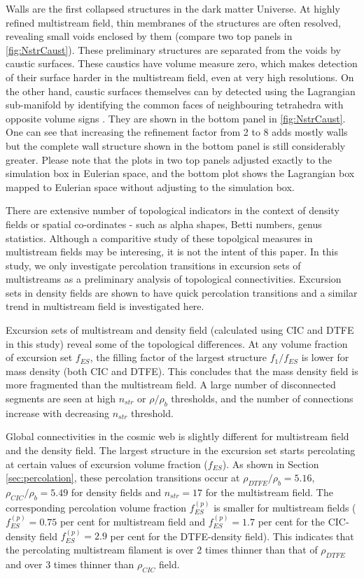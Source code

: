 \documentclass[fleqn,usenatbib,useAMS]{mnras}
\begin{document}
Walls are the first collapsed structures in the dark matter Universe. At highly refined multistream field, thin membranes of the structures are often resolved, revealing small voids enclosed by them (compare two top panels in \autoref{fig:NstrCaust}). These preliminary structures are separated from the voids by caustic surfaces. These caustics have volume measure zero, which makes detection of their surface harder in the multistream field, even at very high resolutions. On the other hand, caustic surfaces themselves can by detected using the Lagrangian sub-manifold by identifying the common faces of neighbouring tetrahedra 
with opposite volume signs \citep{Shandarin2012}. They are shown in the bottom panel in  \autoref{fig:NstrCaust}. One can see that increasing the refinement factor from 2 to 8 adds mostly walls but the complete wall structure shown in the bottom panel is still considerably greater. Please note that the plots in  two top panels adjusted  exactly to the simulation box in Eulerian space, and the bottom plot shows the Lagrangian box mapped to Eulerian space without adjusting to the simulation box.

There are extensive number of topological indicators in the context of density fields or spatial co-ordinates - such as alpha shapes, Betti numbers, genus statistics. Although a comparitive study of these topolgical measures in multistream fields may be interesing, it is not the intent of this paper. In this study, we only investigate percolation transitions in excursion sets of multistreams as a preliminary analysis of topological connectivities. Excursion sets in density fields are shown to have quick percolation transitions \citep{Shandarin2010b} and a similar trend in multistream field is investigated here.


Excursion sets of multistream and density field (calculated using CIC and DTFE in this study) reveal some of the topological differences. At any volume fraction of excursion set $f_{ES}$, the filling factor of the largest structure $f_{1}/f_{ES}$ is lower for mass density (both CIC and DTFE). This concludes that the mass density field is more fragmented than the multistream field. A large number of disconnected segments are seen at high $n_{str}$ or $\rho/ \rho_b$ thresholds, and the number of connections increase with decreasing $n_{str}$ threshold.
  

Global connectivities in the cosmic web is slightly different for multistream field and the density field. The largest structure in the excursion set starts percolating at certain values of excursion volume fraction ($f_{ES}$). As shown in Section \ref{sec:percolation}, these percolation transitions occur at $\rho_{DTFE}/ \rho_b = 5.16 $, $\rho_{CIC}/ \rho_b = 5.49 $ for density fields and $n_{str} = 17$ for the multistream field. The corresponding percolation volume fraction $f_{ES}^{(p)}$ is smaller for multistream fields ( $f_{ES}^{(p)} = 0.75$  per cent for multistream field and $f_{ES}^{(p)} = 1.7$ per cent for the CIC-density field $f_{ES}^{(p)} = 2.9$ per cent for the DTFE-density field). This indicates that the percolating multistream filament is over 2 times thinner than that of $\rho_{DTFE}$ and over 3 times thinner than $\rho_{CIC}$ field. 
\end{document}

